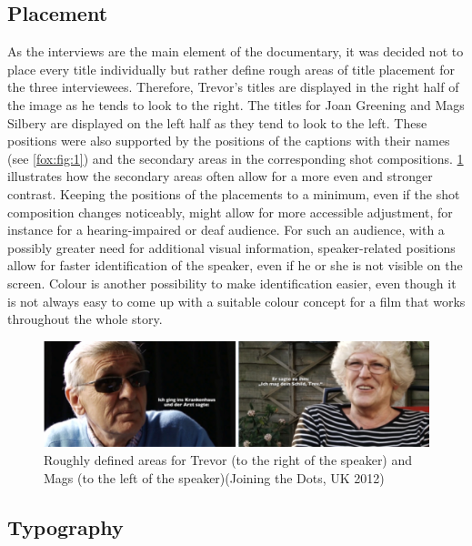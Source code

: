 \documentclass[output=paper]{langsci/langscibook}
\begin{document}
\subsection{Placement }

As the interviews are the main element of the documentary, it was decided not to place every title individually but rather define rough areas of title placement for the three interviewees. Therefore, Trevor’s titles are displayed in the right half of the image as he tends to look to the right. The titles for Joan Greening and Mags Silbery are displayed on the left half as they tend to look to the left. These positions were also supported by the positions of the captions with their names (see \ref{fox:fig:1}) and the secondary areas in the corresponding shot compositions. \ref{fox:fig:5} illustrates how the secondary areas often allow for a more even and stronger contrast. Keeping the positions of the placements to a minimum, even if the shot composition changes noticeably, might allow for more accessible adjustment, for instance for a hearing-impaired or deaf audience. For such an audience, with a possibly greater need for additional visual information, speaker-related positions allow for faster identification of the speaker, even if he or she is not visible on the screen. Colour is another possibility to make identification easier, even though it is not always easy to come up with a suitable colour concept for a film that works throughout the whole story.

\begin{figure}
 \includegraphics[width=\textwidth]{figures/Fox5.png}
 \caption{Roughly defined areas for Trevor (to the right of the speaker) and Mags (to the left of the speaker)(Joining the Dots, UK 2012)}
 \label{fox:fig:5}
\end{figure} 


\subsection{Typography}
\end{document}
